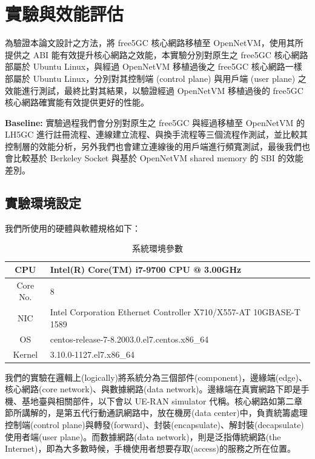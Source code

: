 \chapter{實驗與效能評估}
\label{chapter:evaluation}

為驗證本論文設計之方法，將 free5GC 核心網路移植至 OpenNetVM，使用其所提供之 ABI 能有效提升核心網路之效能，本實驗分別對原生之 free5GC 核心網路部屬於 Ubuntu Linux，與經過 OpenNetVM 移植過後之 free5GC 核心網路一樣部屬於 Ubuntu Linux，分別對其控制端 (control plane) 與用戶端 (user plane) 之效能進行測試，最終比對其結果，以驗證經過 OpenNetVM 移植過後的 free5GC 核心網路確實能有效提供更好的性能。

\textbf{Baseline:} 實驗過程我們會分別對原生之 free5GC 與經過移植至 OpenNetVM 的 LH5GC 進行註冊流程、連線建立流程、與換手流程等三個流程作測試，並比較其控制層的效能分析，另外我們也會建立連線後的用戶端進行頻寬測試，最後我們也會比較基於 Berkeley Socket 與基於 OpenNetVM shared memory 的 SBI 的效能差別。

\section{實驗環境設定}
\label{sec:evaluation_env}

我們所使用的硬體與軟體規格如下：

\begin{table}[h!]
    \centering
    \begin{tabular}{c|l}
        \hline
        CPU & Intel(R) Core(TM) i7-9700 CPU @ 3.00GHz \\
        \hline
        Core No. & 8 \\
        \hline
        NIC & Intel Corporation Ethernet Controller X710/X557-AT 10GBASE-T 1589 \\
        \hline
        OS & centos-release-7-8.2003.0.el7.centos.x86\_64 \\
        \hline
        Kernel & 3.10.0-1127.el7.x86\_64 \\
        \hline
    \end{tabular}
    \caption[系統環境參數]{{\footnotesize 系統環境參數}}
    \label{table:sys_env}
\end{table}

我們的實驗在邏輯上(logically)將系統分為三個部件(component)，邊緣端(edge)、核心網路(core network)、與數據網路(data network)。邊緣端在真實網路下即是手機、基地臺與相關部件，以下會以 UE-RAN simulator 代稱。核心網路如第二章節所講解的，是第五代行動通訊網路中，放在機房(data center)中，負責統籌處理控制端(control plane)與轉發(forward)、封裝(encapsulate)、解封裝(decapsulate)使用者端(user plane)。而數據網路(data network)，則是泛指傳統網路(the Internet)，即為大多數時候，手機使用者想要存取(access)的服務之所在位置。


